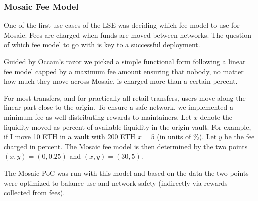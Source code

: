 \subsubsection{Mosaic Fee Model}

One of the first use-cases of the LSE was deciding which fee model to use for Mosaic.
%
Fees are charged when funds are moved between networks. The question of which fee model to go with is key to a successful deployment.

Guided by Occam's razor\cite{WhatRazor} we picked a simple functional form following a linear fee model capped by a maximum fee amount ensuring that nobody, no matter how much they move across Mosaic, is charged more than a certain percent.

For most transfers, and for practically all retail transfers, users move along the linear part close to the origin. To ensure a safe network, we implemented a minimum fee as well distributing rewards to maintainers. Let $x$ denote the liquidity moved as percent of available liquidity in the origin vault. For example, if I move 10 ETH in a vault with 200 ETH $x=5$ (in units of \%). Let $y$ be the fee charged in percent. The Mosaic fee model is then determined by the two points $(x,y)=(0,0.25)$ and $(x,y)=(30,5)$.

The Mosaic PoC was run with this model and based on the data the two points were optimized to balance use and network safety (indirectly via rewards collected from fees).


